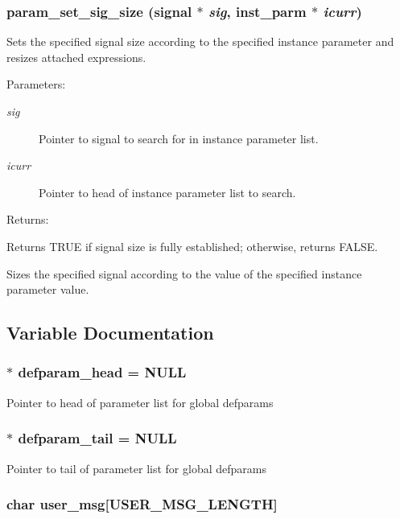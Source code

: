 \subsubsection{ param\_\-set\_\-sig\_\-size ({\bf signal} $\ast$ {\em sig}, {\bf inst\_\-parm} $\ast$ {\em icurr})}\label{param_8c_a11}


Sets the specified signal size according to the specified instance parameter and resizes attached expressions.

\begin{Desc}
\item[Parameters: ]\par
\begin{description}
\item[{\em 
sig}]Pointer to signal to search for in instance parameter list. \item[{\em 
icurr}]Pointer to head of instance parameter list to search.\end{description}
\end{Desc}
\begin{Desc}
\item[Returns: ]\par
Returns TRUE if signal size is fully established; otherwise, returns FALSE.\end{Desc}
Sizes the specified signal according to the value of the specified instance parameter value. 

\subsection{Variable Documentation}
\subsubsection{$\ast$ defparam\_\-head = NULL}\label{param_8c_a0}


Pointer to head of parameter list for global defparams 
\subsubsection{$\ast$ defparam\_\-tail = NULL}\label{param_8c_a1}


Pointer to tail of parameter list for global defparams 
\subsubsection{\setlength{\rightskip}{0pt plus 5cm}char user\_\-msg[USER\_\-MSG\_\-LENGTH]}\label{param_8c_a2}


